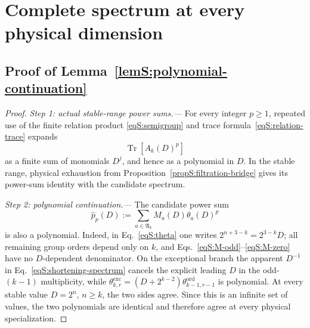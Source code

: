 \documentclass[journal,twocolumn]{IEEEtran}
\theoremstyle{definition}
\theoremstyle{plain}
\newcommand{\Tr}{\operatorname{Tr}}
\newcommand{\Ord}{\mathrm{ord}}
\newcommand{\Exc}{\mathrm{exc}}
\begin{document}
\section{Complete spectrum at every physical dimension}
\label{app:finite}

\subsection{Proof of Lemma~\ref{lemS:polynomial-continuation}}
\label{app:proof-continuation}

\begin{proof}
\emph{Step 1: actual stable-range power sums.---}
For every integer $p\geq1$, repeated use of the finite relation product
\eqref{eqS:semigroup} and trace formula~\eqref{eqS:relation-trace} expands
\begin{equation}
 \Tr[A_k(D)^p]
 \label{eqS:trace-polynomial}
\end{equation}
as a finite sum of monomials $D^j$, and hence as a polynomial in $D$.  In
the stable range, physical exhaustion from
Proposition~\ref{propS:filtration-bridge} gives its power-sum identity with
the candidate spectrum.

\emph{Step 2: polynomial continuation.---}
The candidate power sum
\begin{equation}
 \widehat p_p(D):=
 \sum_{a\in\mathfrak A_k}M_a(D)\theta_a(D)^p
 \label{eqS:predicted-polynomial}
\end{equation}
is also a polynomial.  Indeed, in Eq.~\eqref{eqS:theta} one writes
$2^{n+3-k}=2^{3-k}D$; all remaining group orders depend only on $k$, and
Eqs.~\eqref{eqS:M-odd}--\eqref{eqS:M-zero} have no $D$-dependent
denominator.  On the exceptional branch the apparent $D^{-1}$ in
Eq.~\eqref{eqS:shortening-spectrum} cancels the explicit leading $D$ in the
odd-$(k-1)$ multiplicity, while
$\theta^{\Exc}_{k,r}=(D+2^{k-2})\theta^{\Ord}_{k-1,r-1}$ is polynomial.
At every stable value $D=2^n$, $n\geq k$, the two sides agree.  Since this
is an infinite set of values, the two polynomials are identical and therefore
agree at every physical specialization.


\end{proof}
\end{document}
